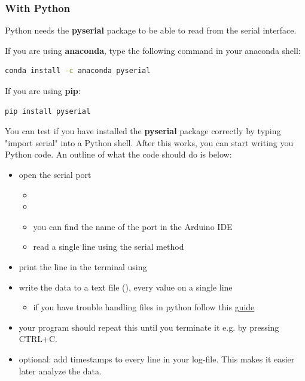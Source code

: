\subsubsection{With Python}

Python needs the \textbf{pyserial} package to be able to read from the serial interface.


\noindent If you are using \textbf{anaconda}, type the following command in your anaconda shell:
\begin{lstlisting}[language=bash]
  conda install -c anaconda pyserial
\end{lstlisting}

\noindent If you are using \textbf{pip}:
\begin{lstlisting}[language=bash]
  pip install pyserial
\end{lstlisting}


You can test if you have installed the \textbf{pyserial} package correctly by typing "import serial" into a Python shell. After this works, you can start writing you Python code. An outline of what the code should do is below:
\begin{itemize}
	\item open the serial port
	\begin{itemize}
		\item {}
		\item {}
		\item you can find the name of the port in the Arduino \ac{IDE}
		\item read a single line using the serial method   
	\end{itemize}
	\item print the line in the terminal using 
	\item write the data to a text file (), every value on a single line
	\begin{itemize}
		\item if you have trouble handling files in python follow this \href{http://www.pythonforbeginners.com/files/reading-and-writing-files-in-python}{guide}
	\end{itemize}
	\item your program should repeat this until you terminate it e.g. by pressing CTRL+C.
	\item optional: add timestamps to every line in your log-file. This makes it easier later analyze the data.
\end{itemize}

